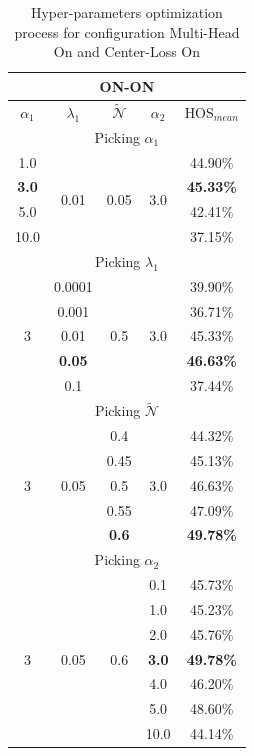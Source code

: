 \documentclass[10pt,twocolumn,letterpaper]{article}
\begin{document}
\begin{table}[hb!]
  \centering
  \begin{tabular}[h]{||c|c|c|c||c||}
    \hline
    \multicolumn{5}{||c||}{ON-ON} \\
    \hline
    $\alpha_1$ & $\lambda_1$ & $\mathcal{\tilde N}$ & $\alpha_2$ & HOS$_{mean}$ \\
    \hline
    \hline
    \multicolumn{5}{||c||}{Picking $\alpha_1$} \\
    \hline
    1.0 & \multirow{4}{*}{0.01} & \multirow{4}{*}{0.05} & \multirow{4}{*}{3.0} & 44.90\% \\
    {\bf 3.0} & && & {\bf 45.33\%} \\
    5.0 & && & 42.41\% \\
    10.0 & && & 37.15\% \\
    \hline
    \hline
    \multicolumn{5}{||c||}{Picking $\lambda_1$} \\
    \hline
    \multirow{5}{*}{3} & 0.0001 & \multirow{5}{*}{0.5} & \multirow{5}{*}{3.0} & 39.90\% \\
    & 0.001 & & & 36.71\% \\
    & 0.01 & & & 45.33\% \\
    & {\bf 0.05 }& & & {\bf 46.63\%} \\
    & 0.1 & & & 37.44\% \\
    \hline
    \hline
    \multicolumn{5}{||c||}{Picking $\mathcal{\tilde N}$} \\
    \hline
    \multirow{5}{*}{3} & \multirow{5}{*}{0.05} & 0.4 & \multirow{5}{*}{3.0} & 44.32\% \\
    & & 0.45 & & 45.13\% \\
    & & 0.5 & & 46.63\% \\
    & & 0.55 & & 47.09\% \\
    & & {\bf 0.6} & & {\bf 49.78\%} \\
    \hline
    \hline
    \multicolumn{5}{||c||}{Picking $\alpha_2$} \\
    \hline
    \multirow{7}{*}{3} & \multirow{7}{*}{0.05} & \multirow{7}{*}{0.6} & 0.1 & 45.73\% \\
    & & & 1.0 & 45.23\% \\
    & & & 2.0 & 45.76\% \\
    & & & {\bf 3.0} & {\bf 49.78\%} \\
    & & & 4.0 & 46.20\% \\
    & & & 5.0 & 48.60\% \\
    & & & 10.0 & 44.14\% \\
    \hline
  \end{tabular}
  \caption{\centering\label{tab:ablationonon} Hyper-parameters optimization process for configuration Multi-Head On and Center-Loss On}
\end{table}
\end{document}
